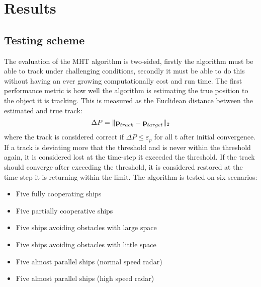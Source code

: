 \section{Results}
\label{sec:results}

\subsection{Testing scheme}
The evaluation of the MHT algorithm is two-sided, firstly the algorithm must be able to track under challenging conditions, secondly it must be able to do this without having an ever growing computationally cost and run time. The first performance metric is how well the algorithm is estimating the true position to the object it is tracking. This is measured as the Euclidean distance between the estimated and true track:
\begin{equation}
	\Delta P = \| \boldsymbol{\mathbf{p}}_{track}-\boldsymbol{\mathbf{p}}_{target} \|_2
\end{equation}
where the track is considered correct if $\Delta P \leq	\varepsilon_p$ for all t after initial convergence. If a track is deviating more that the threshold and is never within the threshold again, it is considered lost at the time-step it exceeded the threshold. If the track should converge after exceeding the threshold, it is considered restored at the time-step it is returning within the limit. The algorithm is tested on six scenarios:
\begin{itemize}
	\item Five fully cooperating ships
    \item Five partially cooperative ships
    \item Five ships avoiding obstacles with large space
    \item Five ships avoiding obstacles with little space
	\item Five almost parallel ships (normal speed radar)
	\item Five almost parallel ships (high speed radar)
\end{itemize}

